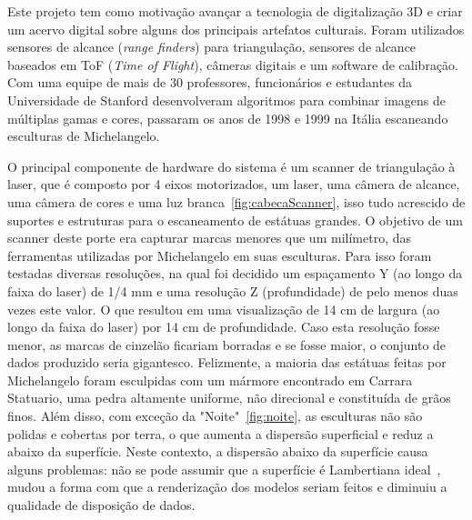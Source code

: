Este projeto tem como motivação avançar a tecnologia de digitalização 3D e criar um acervo digital sobre alguns dos principais artefatos culturais. Foram utilizados sensores de alcance (\emph{range finders}) para triangulação, sensores de alcance baseados em ToF (\emph{Time of Flight}), câmeras digitais e um software de calibração. Com uma equipe de mais de 30 professores, funcionários e estudantes da Universidade de Stanford desenvolveram algoritmos para combinar imagens de múltiplas gamas e cores, passaram os anos de 1998 e 1999 na Itália escaneando esculturas de Michelangelo. 

O principal componente de hardware do sistema é um scanner de triangulação à laser, que é composto por 4 eixos motorizados, um laser, uma câmera de alcance, uma câmera de cores e uma luz branca~\ref{fig:cabecaScanner}, isso tudo acrescido de suportes e estruturas para o escaneamento de estátuas grandes. O objetivo de um scanner deste porte era capturar marcas menores que um milímetro, das ferramentas utilizadas por Michelangelo em suas esculturas. 
Para isso foram testadas diversas resoluções, na qual foi decidido um espaçamento Y (ao longo da faixa do laser) de 1/4 mm e uma resolução Z (profundidade) de pelo menos duas vezes este valor. 
O que resultou em uma visualização de 14 cm de largura (ao longo da faixa do laser) por 14 cm de profundidade. Caso esta resolução fosse menor, as marcas de cinzelão ficariam borradas e se fosse maior, o conjunto de dados produzido seria gigantesco.
Felizmente, a maioria das estátuas feitas por Michelangelo foram esculpidas com um mármore encontrado em Carrara Statuario, uma pedra altamente uniforme, não direcional e constituída de grãos finos. Além disso, com exceção da "Noite"~\ref{fig:noite}, as esculturas não são polidas e cobertas por terra, o que aumenta a dispersão superficial e reduz a abaixo da superfície.
Neste contexto, a dispersão abaixo da superfície causa alguns problemas: não se pode assumir que a superfície é Lambertiana ideal~\cite{basri2003lambertian}, mudou a forma com que a renderização dos modelos seriam feitos e diminuiu a qualidade de disposição de dados.

